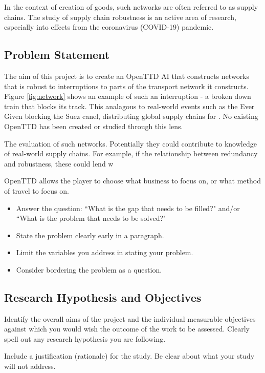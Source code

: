 \documentclass[a4paper,11pt]{article}
\begin{document}
In the context of creation of goods, such networks are often referred to as supply chains. The study of supply chain robustness is an active area of research, especially into effects from the coronavirus (COVID-19) pandemic.

\subsection{Problem Statement}

The aim of this project is to create an OpenTTD AI that constructs networks that is robust to interruptions to parts of the transport network it constructs. Figure \ref{fig:network} shows an example of such an interruption - a broken down train that blocks its track. This analagous to real-world events such as the Ever Given blocking the Suez canel, distributing global supply chains for . No existing OpenTTD has been created or studied through this lens.

The evaluation of such networks. Potentially they could contribute to knowledge of real-world supply chains. For example, if the relationship between redundancy and robustness, these could lend w

OpenTTD allows the player to choose what business to focus on, or what method of travel to focus on.

\begin{itemize}
    \item Answer the question: ``What is the gap that needs to be filled?"
    and/or ``What is the problem that needs to be solved?"
    \item State the problem clearly early in a paragraph.
    \item Limit the variables you address in stating your problem.
    \item Consider bordering the problem as a question.
\end{itemize}

\subsection{Research Hypothesis and Objectives}

Identify the overall aims of the project and the individual measurable objectives against which you would wish the outcome of the work to be assessed. Clearly spell out any research hypothesis you are following.

Include a justification (rationale) for the study. Be clear about what your study will not address.
\end{document}
